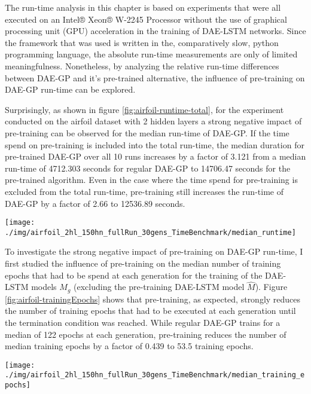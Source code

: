 \documentclass[
  11pt,
]{article}
\let\origfigure\figure
\let\endorigfigure\endfigure
\renewenvironment{figure}[1][2] {
    \expandafter\origfigure\expandafter[H]
} {
    \endorigfigure
}
\begin{document}
The run-time analysis in this chapter is based on experiments that were all executed on an Intel® Xeon® W-2245 Processor without the use of graphical processing unit (GPU) acceleration in the training of DAE-LSTM networks. Since the framework that was used is written in the, comparatively slow, python programming language, the absolute run-time measurements are only of limited meaningfulness. Nonetheless, by analyzing the relative run-time differences between DAE-GP and it's pre-trained alternative, the influence of pre-training on DAE-GP run-time can be explored.

Surprisingly, as shown in figure \ref{fig:airfoil-runtime-total}, for the experiment conducted on the airfoil dataset with 2 hidden layers a strong negative impact of pre-training can be observed for the median run-time of DAE-GP. If the time spend on pre-training is included into the total run-time, the median duration for pre-trained DAE-GP over all 10 runs increases by a factor of 3.121 from a median run-time of 4712.303 seconds for regular DAE-GP to 14706.47 seconds for the pre-trained algorithm. Even in the case where the time spend for pre-training is excluded from the total run-time, pre-training still increases the run-time of DAE-GP by a factor of 2.66 to 12536.89 seconds.

\begin{figure}[c]

{\centering \texttt{[image: ./img/airfoil\_2hl\_150hn\_fullRun\_30gens\_TimeBenchmark/median\_runtime]} 

}

\caption{Median Runtime - Airfoil}\label{fig:airfoil-runtime-total}
\end{figure}

To investigate the strong negative impact of pre-training on DAE-GP run-time, I first studied the influence of pre-training on the median number of training epochs that had to be spend at each generation for the training of the DAE-LSTM models \(M_g\) (excluding the pre-training DAE-LSTM model \(\hat{M}\)). Figure \ref{fig:airfoil-trainingEpochs} shows that pre-training, as expected, strongly reduces the number of training epochs that had to be executed at each generation until the termination condition was reached. While regular DAE-GP trains for a median of 122 epochs at each generation, pre-training reduces the number of median training epochs by a factor of 0.439 to 53.5 training epochs.

\begin{figure}[c]

{\centering \texttt{[image: ./img/airfoil\_2hl\_150hn\_fullRun\_30gens\_TimeBenchmark/median\_training\_epochs]} 

}

\caption{Median Number of Training Epochs per Generation - Airfoil}\label{fig:airfoil-trainingEpochs}
\end{figure}
\end{document}
